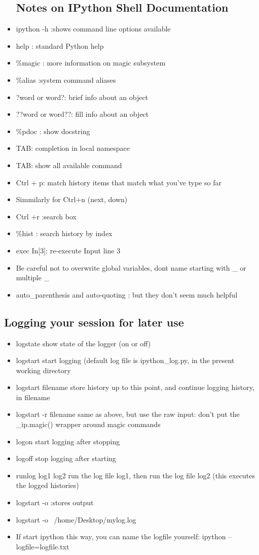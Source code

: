\documentclass[12 pt , twoside, letterpaper] {article}
\begin{document}
\begin{itemize}
\subsection{Notes on IPython Shell Documentation}
\item ipython -h :shows command line options available
\item help : standard Python help
\item \%magic : more information on magic subsystem
\item \%alias :system command aliases
\item ?word or word?: brief info about an object
\item ??word or word??: fill info about an object
\item \%pdoc : show docstring 
\item TAB: completion in local namespace
\item TAB: show all available command
\item Ctrl + p: match history items that match what you've type so far
\item Simmilarly for Ctrl+n (next, down)
\item Ctrl +r :search box
\item \%hist : search history by index 
\item exec In[3]: re-execute Input line 3
\item Be careful not to overwrite global variables, dont name starting with \_ or multiple \_
\item auto\_parenthesis and auto-quoting : but they don't seem much helpful
\end{itemize}
\subsection{Logging your session for later use}
\begin{itemize}
\item logstate	show state of the logger (on or off)
\item logstart	start logging (default log file is ipython\_log.py, in the present working directory
\item logstart filename	store history up to this point, and continue logging history, in filename
\item logstart -r filename	same as above, but use the raw input: don't put the \_ip.magic() wrapper around magic commands
\item logon	start logging after stopping
\item logoff	stop logging after starting
\item runlog log1 log2	run the log file log1, then run the log file log2 (this executes the logged histories)

\item logstart -o :stores output
\item logstart -o ~/home/Desktop/mylog.log
\item If start ipython this way, you can name the logfile yourself:
ipython --logfile=logfile.txt
\end{itemize}
\end{document}
